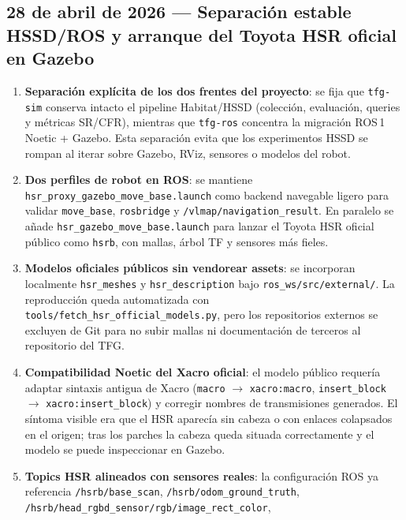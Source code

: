 \documentclass[11pt,a4paper]{article}
\begin{document}
\subsection*{28 de abril de 2026 --- Separación estable HSSD/ROS y arranque del Toyota HSR oficial en Gazebo}

\begin{enumerate}
  \item \textbf{Separación explícita de los dos frentes del proyecto}: se fija
        que \texttt{tfg-sim} conserva intacto el pipeline Habitat/HSSD
        (colección, evaluación, queries y métricas SR/CFR), mientras que
        \texttt{tfg-ros} concentra la migración ROS\,1 Noetic + Gazebo. Esta
        separación evita que los experimentos HSSD se rompan al iterar sobre
        Gazebo, RViz, sensores o modelos del robot.
  \item \textbf{Dos perfiles de robot en ROS}: se mantiene
        \texttt{hsr\_proxy\_gazebo\_move\_base.launch} como backend navegable
        ligero para validar \texttt{move\_base}, \texttt{rosbridge} y
        \texttt{/vlmap/navigation\_result}. En paralelo se añade
        \texttt{hsr\_gazebo\_move\_base.launch} para lanzar el Toyota HSR
        oficial público como \texttt{hsrb}, con mallas, árbol TF y sensores más
        fieles.
  \item \textbf{Modelos oficiales públicos sin vendorear assets}: se incorporan
        localmente \texttt{hsr\_meshes} y \texttt{hsr\_description} bajo
        \texttt{ros\_ws/src/external/}. La reproducción queda automatizada con
        \texttt{tools/fetch\_hsr\_official\_models.py}, pero los repositorios
        externos se excluyen de Git para no subir mallas ni documentación de
        terceros al repositorio del TFG.
  \item \textbf{Compatibilidad Noetic del Xacro oficial}: el modelo público
        requería adaptar sintaxis antigua de Xacro
        (\texttt{macro} $\rightarrow$ \texttt{xacro:macro},
        \texttt{insert\_block} $\rightarrow$ \texttt{xacro:insert\_block}) y
        corregir nombres de transmisiones generados. El síntoma visible era que
        el HSR aparecía sin cabeza o con enlaces colapsados en el origen; tras
        los parches la cabeza queda situada correctamente y el modelo se puede
        inspeccionar en Gazebo.
  \item \textbf{Topics HSR alineados con sensores reales}: la configuración
        ROS ya referencia \texttt{/hsrb/base\_scan},
        \texttt{/hsrb/odom\_ground\_truth},
        \texttt{/hsrb/head\_rgbd\_sensor/rgb/image\_rect\_color},

\end{enumerate}
\end{document}
